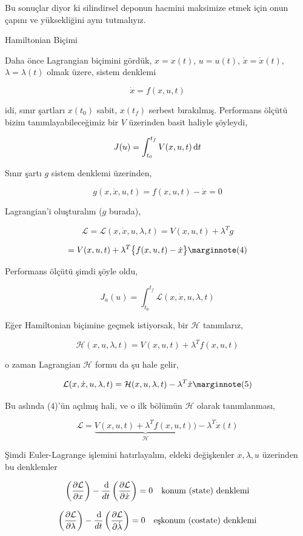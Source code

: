 \documentclass[12pt,fleqn]{article}\usepackage{../../common}
\begin{document}
Bu sonuçlar diyor ki silindirsel deponun hacmini maksimize etmek için onun
çapını ve yüksekliğini aynı tutmalıyız. 

Hamiltonian Biçimi 

Daha önce Lagrangian biçimini gördük, $x=x(t)$, $u=u(t)$,
$\dot{x}=\dot{x}(t)$, $\lambda=\lambda(t)$ olmak üzere, sistem denklemi

$$
\dot{x} = f(x, u, t)
$$

idi, sınır şartları $x(t_0)$ sabit, $x(t_f)$ serbest
bırakılmış. Performans ölçütü bizim tanımlayabileceğimiz bir $V$
üzerinden basit haliyle şöyleydi,

$$
J(u) = \int_{t_0}^{t_f} V(x, u, t) \,\mathrm{d} t
$$

Sınır şartı $g$ sistem denklemi üzerinden,

$$
g(x, \dot{x}, u, t) = f(x, u, t) - \dot{x} = 0
$$

Lagrangian'i oluşturalım ($g$ burada), 

$$
\mathcal{L} = \mathcal{L}( x, \dot{x}, u, \lambda, t) =
V( x, u, t) +  \lambda^T g 
$$

$$
= V(x, u, t) +  \lambda^T \big\{ f(x, u, t) - \dot{x} \big\}
\mlabel{4}
$$


Performans ölçütü şimdi şöyle oldu,

$$
J_a(u) = \int_{t_0}^{t_f} \mathcal{L}( x, \dot{x}, u, \lambda, t)
$$

Eğer Hamiltonian biçimine geçmek istiyorsak, bir $\mathcal{H}$ tanımlarız,

$$
\mathcal{H}(x, u, \lambda, t) = V( x, u, t) + \lambda^T f(x, u, t)
$$

o zaman Lagrangian $\mathcal{H}$ formu da şu hale gelir,

$$
\mathcal{L}( x, \dot{x}, u, \lambda, t) = 
\mathcal{H}(x, u, \lambda, t) - \lambda^T \dot{x}
\mlabel{5}
$$

Bu aslında (4)'ün açılmış hali, ve o ilk bölümün $\mathcal{H}$ olarak tanımlanması,

$$ 
\mathcal{L} = \underbrace{V( x, u, t) + \lambda^T f( x, u, t))}_{\mathcal{H}} - 
\lambda^T \dot{x}(t) 
$$ 

Şimdi Euler-Lagrange işlemini hatırlayalım, eldeki değişkenler
$x,\lambda,u$ üzerinden bu denklemler

$$
\left( \frac{\partial \mathcal{L}}{\partial x} \right) -
\frac{\,\mathrm{d}}{dt} \left( \frac{\partial \mathcal{L}}{\partial \dot{x}} \right) 
= 0 
\quad
\textrm{konum (state) denklemi}
$$

$$
\left( \frac{\partial \mathcal{L}}{\partial \lambda} \right) -
\frac{\,\mathrm{d}}{dt} \left( \frac{\partial \mathcal{L}}{\partial \dot{\lambda}} \right) 
= 0
\quad
\textrm{eşkonum (costate) denklemi}
$$
\end{document}

